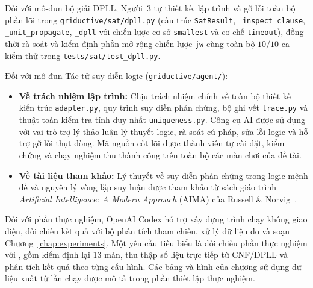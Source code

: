 Đối với mô-đun bộ giải DPLL, Người~3 tự thiết kế, lập trình và gỡ lỗi toàn bộ phần lõi trong \texttt{griductive/sat/dpll.py} (cấu trúc \texttt{SatResult}, \texttt{\_inspect\_clause}, \texttt{\_unit\_propagate}, \texttt{\_dpll} với chiến lược cơ sở \texttt{smallest} và cơ chế \texttt{timeout}), đồng thời rà soát và kiểm định phần mở rộng chiến lược \texttt{jw} cùng toàn bộ $10/10$ ca kiểm thử trong \texttt{tests/sat/test\_dpll.py}.

Đối với mô-đun Tác tử suy diễn logic (\texttt{griductive/agent/}):
\begin{itemize}
    \item \textbf{Về trách nhiệm lập trình:} Chịu trách nhiệm chính về toàn bộ thiết kế kiến trúc \texttt{adapter.py}, quy trình suy diễn phản chứng, bộ ghi vết \texttt{trace.py} và thuật toán kiểm tra tính duy nhất \texttt{uniqueness.py}. Công cụ AI được sử dụng với vai trò trợ lý thảo luận lý thuyết logic, rà soát cú pháp, sửa lỗi logic và hỗ trợ gỡ lỗi thụt dòng. Mã nguồn cốt lõi được thành viên tự cài đặt, kiểm chứng và chạy nghiệm thu thành công trên toàn bộ các màn chơi của đề tài.
    \item \textbf{Về tài liệu tham khảo:} Lý thuyết về suy diễn phản chứng trong logic mệnh đề và nguyên lý vòng lặp suy luận được tham khảo từ sách giáo trình \textit{Artificial Intelligence: A Modern Approach} (AIMA) của Russell \& Norvig~\cite{russell2020aima}.
\end{itemize}

Đối với phần thực nghiệm, OpenAI Codex hỗ trợ xây dựng trình chạy không giao diện, đối chiếu kết quả với bộ phân tích tham chiếu, xử lý dữ liệu đo và soạn Chương~\ref{chap:experiments}. Một yêu cầu tiêu biểu là đối chiếu phần thực nghiệm với , gồm kiểm định lại 13 màn, thu thập số liệu trực tiếp từ CNF/DPLL và phân tích kết quả theo từng cấu hình. Các bảng và hình của chương sử dụng dữ liệu xuất từ lần chạy được mô tả trong phần thiết lập thực nghiệm.
